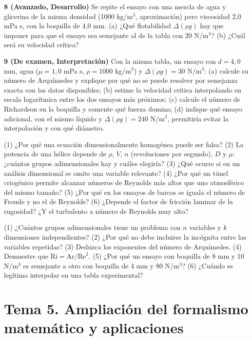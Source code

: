 \documentclass[10pt,openany]{book}
\begin{document}
\begin{tcolorbox}[title={Ejercicios propuestos}, studiumworked, breakable]
\noindent\textbf{8 (Avanzado, Desarrollo)}
Se repite el ensayo con una mezcla de agua y glicerina de la misma densidad (1000 kg/m\(^3\), aproximación) pero viscosidad 2,0 mPa s, con la boquilla de 4,0 mm. (a) ¿Qué flotabilidad \(\Delta(\rho g)\) hay que imponer para que el ensayo sea semejante al de la tabla con 20 N/m\(^3\)? (b) ¿Cuál será su velocidad crítica?

\noindent\textbf{9 (De examen, Interpretación)}
Con la misma tabla, un ensayo con \(d = 4{,}0\) mm, agua (\(\mu = 1{,}0\) mPa s, \(\rho = 1000\) kg/m\(^3\)) y \(\Delta(\rho g) = 30\) N/m\(^3\): (a) calcule su número de Arquímedes y explique por qué no se puede resolver por semejanza exacta con los datos disponibles; (b) estime la velocidad crítica interpolando en escala logarítmica entre los dos ensayos más próximos; (c) calcule el número de Richardson en la boquilla y comente qué fuerza domina; (d) indique qué ensayo adicional, con el mismo líquido y \(\Delta(\rho g) = 240\) N/m\(^3\), permitiría evitar la interpolación y con qué diámetro.
\end{tcolorbox}

\begin{tcolorbox}[title={Autoevaluación}, studiumcheck, breakable]

(1) ¿Por qué una ecuación dimensionalmente homogénea puede ser falsa? (2) La potencia de una hélice depende de \(\rho\), \(V\), \(n\) (revoluciones por segundo), \(D\) y \(\mu\): ¿cuántos grupos adimensionales hay y cuáles elegiría? (3) ¿Qué ocurre si en un análisis dimensional se omite una variable relevante? (4) ¿Por qué un túnel criogénico permite alcanzar números de Reynolds más altos que uno atmosférico del mismo tamaño? (5) ¿Por qué en los ensayos de barcos se iguala el número de Froude y no el de Reynolds? (6) ¿Depende el factor de fricción laminar de la rugosidad? ¿Y el turbulento a número de Reynolds muy alto?

(1) ¿Cuántos grupos adimensionales tiene un problema con \(n\) variables y \(k\) dimensiones independientes? (2) ¿Por qué no debe incluirse la incógnita entre las variables repetidas? (3) Deduzca los exponentes del número de Arquímedes. (4) Demuestre que \(\mathrm{Ri} = \mathrm{Ar}/\mathrm{Re}^{2}\). (5) ¿Por qué un ensayo con boquilla de 8 mm y 10 N/m\(^3\) es semejante a otro con boquilla de 4 mm y 80 N/m\(^3\)? (6) ¿Cuándo es legítimo interpolar en una tabla experimental?
\end{tcolorbox}
\studiumchaptercheck

\part{Tema 5. Ampliación del formalismo matemático y aplicaciones}
\end{document}
